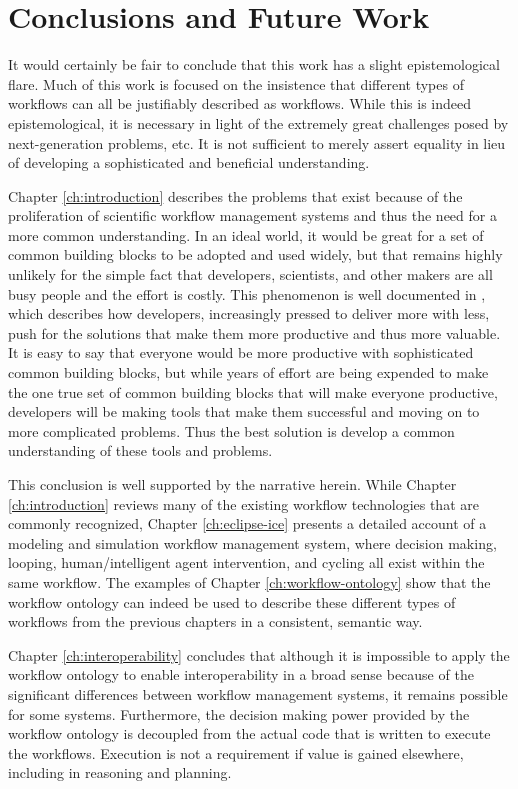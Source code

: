 \chapter{Conclusions and Future Work}\label{ch:conclusions}

It would certainly be fair to conclude that this work has a slight
epistemological flare. Much of this work is focused on the insistence that
different types of workflows can all be justifiably described as workflows.
While this is indeed epistemological, it is necessary in light of the extremely
great challenges posed by next-generation problems, etc. It is not sufficient to
merely assert equality in lieu of developing a sophisticated and beneficial
understanding.

Chapter \ref{ch:introduction} describes the problems that exist because of the
proliferation of scientific workflow management systems and thus the need for a
more common understanding. In an ideal world, it would be great for a set of
common building blocks to be adopted and used widely, but that remains highly
unlikely for the simple fact that developers, scientists, and other makers are
all busy people and the effort is costly. This phenomenon is well documented in
\cite{ogrady_new_2013}, which describes how developers, increasingly pressed to
deliver more with less, push for the solutions that make them more productive
and thus more valuable. It is easy to say that everyone would be more productive
with sophisticated common building blocks, but while years of effort are being
expended to make the one true set of common building blocks that will make
everyone productive, developers will be making tools that make them successful
and moving on to more complicated problems. Thus the best solution is develop a
common understanding of these tools and problems.

This conclusion is well supported by the narrative herein. While Chapter
\ref{ch:introduction} reviews many of the existing workflow technologies that
are commonly recognized, Chapter \ref{ch:eclipse-ice} presents a detailed
account of a modeling and simulation workflow management system, where decision
making, looping, human/intelligent agent intervention, and cycling all exist
within the same workflow. The examples of Chapter \ref{ch:workflow-ontology}
show that the workflow ontology can indeed be used to describe these different
types of workflows from the previous chapters in a consistent, semantic way.

Chapter \ref{ch:interoperability} concludes that although it is impossible to
apply the workflow ontology to enable interoperability in a broad sense because
of the significant differences between workflow management systems, it
remains possible for some systems. Furthermore, the decision making power
provided by the workflow ontology is decoupled from the actual code that is
written to execute the workflows. Execution is not a requirement if value is
gained elsewhere, including in reasoning and planning.

